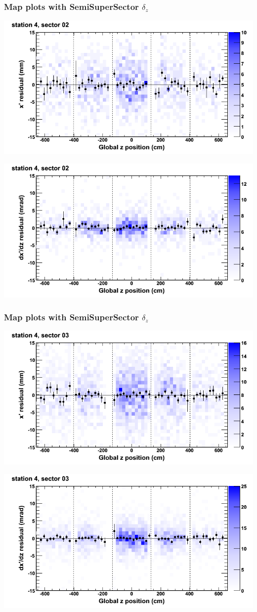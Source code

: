 \documentclass[compress]{beamer}
\begin{document}
\begin{frame}
\frametitle{Map plots with SemiSuperSector $\delta_z$}
\includegraphics[width=0.5\linewidth]{zfit_mapplots/DTvsz_st4sec02_x.png}

\includegraphics[width=0.5\linewidth]{zfit_mapplots/DTvsz_st4sec02_dxdz.png}
\end{frame}

\begin{frame}
\frametitle{Map plots with SemiSuperSector $\delta_z$}
\includegraphics[width=0.5\linewidth]{zfit_mapplots/DTvsz_st4sec03_x.png}

\includegraphics[width=0.5\linewidth]{zfit_mapplots/DTvsz_st4sec03_dxdz.png}
\end{frame}
\end{document}
